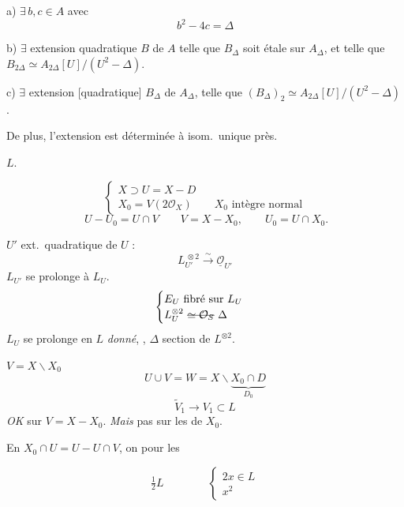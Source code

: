 \documentclass[11pt,a4paper]{article}
\begin{document}
a) $\exists\, b,c\in A$ avec
\[
b^2-4c=\Delta
\]

b) $\exists$ extension quadratique $B$ de $A$ telle que $B_\Delta$ soit étale sur $A_\Delta$, et telle que $B_{2\Delta}\simeq A_{2\Delta}[U]/(U^2-\Delta)$.

c) $\exists$ extension [quadratique]   $B_\Delta$ de $A_\Delta$, telle que $(B_\Delta)_2\simeq A_{2\Delta}[U]/(U^2-\Delta)$.

De plus, l'extension   \struck{\ill{}} est déterminée à isom.\ unique près.

$L$.

\[
\begin{cases}
X\supset U=X-D \\
X_0=V(2\mathcal{O}_X)\qquad X_0 \text{ intègre normal}
\end{cases}
\]
\[
\ U-U_0=U\cap V\qquad V=X-X_0,\qquad U_0=U\cap X_0 .
\]

$U'$ ext.\ quadratique de $U$ :
\[
L_{U'}^{\,\otimes 2}\xrightarrow{\ \sim\ }\underline{\mathcal{O}}_{U'}
\]
$L_{U'}$ se prolonge à $L_U$.
\[
\begin{cases}
E_U \text{ fibré sur } L_U \\
L_U^{\otimes 2}\ \text{\struck{$\simeq\mathcal{O}_S$}}\ \Delta
\end{cases}
\]
$L_U$ se prolonge en $L$ \emph{donné}, , $\Delta$ section de $L^{\otimes 2}$.

$V=X\smallsetminus X_0$
\[
U\cup V=W=X\smallsetminus \underbrace{X_0\cap D}_{D_0}
\]
\[
\widetilde{V}_1\to V_1\subset L
\]
\emph{OK} sur $V=X-{}$${}X_0$.
\emph{Mais} pas sur les  de $X_0$.

En \ill{} \ill{} $X_0\cap U=U-U\cap V$, on \ill{} pour les \ill{} \ill{} \ill{} \ill{}

\[
\tfrac{1}{2}L\qquad\qquad
\begin{cases} 2x\in L \\ x^2 \end{cases}
\]

\end{document}
